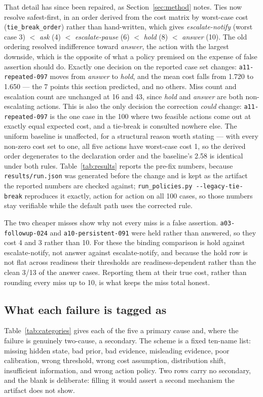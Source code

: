 \documentclass{article}
\begin{document}
That detail has since been repaired, as Section~\ref{sec:method} notes. Ties now
resolve safest-first, in an order derived from the cost matrix by worst-case cost
(\texttt{tie\_break\_order}) rather than hand-written, which gives
\emph{escalate-notify} (worst case 3) $<$ \emph{ask} (4) $<$
\emph{escalate-pause} (6) $<$ \emph{hold} (8) $<$ \emph{answer} (10). The old
ordering resolved indifference toward \emph{answer}, the action with the largest
downside, which is the opposite of what a policy premised on the expense of false
assertion should do. Exactly one decision on the reported case set changes:
\texttt{a11-repeated-097} moves from \emph{answer} to \emph{hold}, and the mean cost
falls from 1.720 to 1.650 --- the 7 points this section predicted, and no others.
Miss count and escalation count are unchanged at 16 and 43, since \emph{hold} and
\emph{answer} are both non-escalating actions. This is also the only decision the
correction \emph{could} change: \texttt{a11-repeated-097} is the one case in the 100
where two feasible actions come out at exactly equal expected cost, and a tie-break
is consulted nowhere else. The uniform baseline is unaffected, for a structural
reason worth stating --- with every non-zero cost set to one, all five actions have
worst-case cost 1, so the derived order degenerates to the declaration order and the
baseline's 2.58 is identical under both rules. Table~\ref{tab:results}
reports the pre-fix numbers, because \texttt{results/run.json} was generated before
the change and is kept as the artifact the reported numbers are checked against;
\texttt{run\_policies.py -}\texttt{-legacy-tie-break} reproduces it exactly, action
for action on all 100 cases, so those numbers stay verifiable while the default path
uses the corrected rule.

The two cheaper misses show why not every miss is a false assertion.
\texttt{a03-followup-024} and \texttt{a10-persistent-091} were held rather than
answered, so they cost 4 and 3 rather than 10. For these the binding comparison
is hold against escalate-notify, not answer against escalate-notify, and because
the hold row is not flat across readiness their thresholds are readiness-dependent
rather than the clean 3/13 of the answer cases. Reporting them at their true cost,
rather than rounding every miss up to 10, is what keeps the miss total honest.

\subsection{What each failure is tagged as}
Table~\ref{tab:categories} gives each of the five a primary cause and, where the
failure is genuinely two-cause, a secondary. The scheme is a fixed ten-name list:
missing hidden state, bad prior, bad evidence, misleading evidence, poor
calibration, wrong threshold, wrong cost assumption, distribution shift,
insufficient information, and wrong action policy. Two rows carry no secondary, and
the blank is deliberate: filling it would assert a second mechanism the artifact
does not show.
\end{document}
